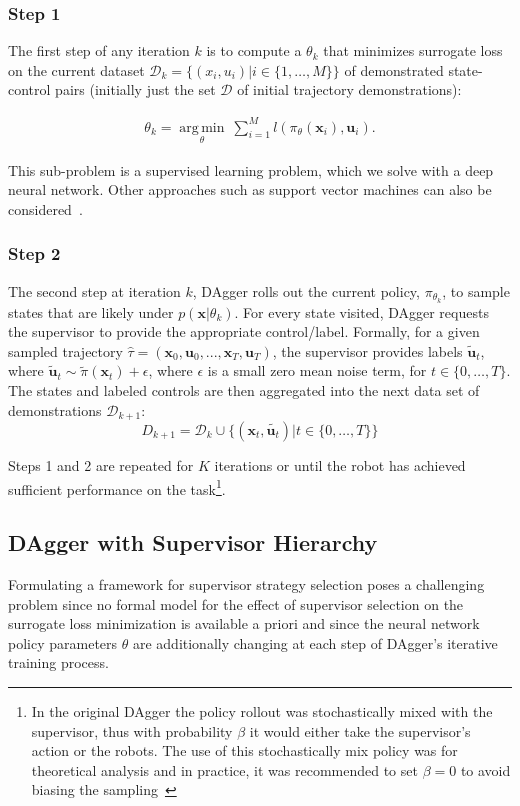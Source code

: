 \documentclass[10pt, conference]{ieeeconf}      %
\DeclareMathOperator*{\argmin}{arg\,min}
\newcommand{\bu}{\mathbf{u}}
\newcommand{\bx}{\mathbf{x}}
\begin{document}
\subsubsection{Step 1}
The first step of any iteration $k$ is to compute a $\theta_k$ that minimizes surrogate loss on the current dataset $\mathcal{D}_k=\{(x_i,u_i)|i\in\{1,\ldots,M\}\}$ of demonstrated state-control pairs (initially just the set $\mathcal{D}$ of initial trajectory demonstrations):

 \vspace{-1ex}
\begin{align}\label{eq:super_objj}
\theta_{k} = \underset{\theta}{\argmin} \: \sum_{i=1}^{M} l(\pi_{\theta}(\bx_i),\bu_i).
\end{align}

This sub-problem is a supervised learning problem, which we solve with a deep neural network. Other approaches such as
support vector machines can also be considered~\cite{scholkopf2002learning}. 
 

 \subsubsection{Step 2}
The second step at iteration $k$, DAgger rolls out the current policy, $\pi_{\theta_{k}}$, to sample states that are likely under $p(\bx|\theta_{k})$.  For every state visited, DAgger requests the supervisor to provide the appropriate control/label. Formally, for a given sampled trajectory  $\hat{\tau} = (\bx_0,\bu_0,...,\bx_T,\bu_T )$, the supervisor provides labels $\tilde{\bu}_t$, where $\tilde{\bu}_t \sim \tilde{\pi}(\bx_t) + \epsilon$, where $\epsilon$ is a small zero mean noise term, for $t\in \{0, \ldots, T\}$.
The states and labeled controls are then aggregated into the next data set of demonstrations $\mathcal{D}_{k+1}$:
$$D_{k+1}=\mathcal{D}_k \cup \{(\bx_t,\tilde{\bu_t})|t\in\{0,\ldots,T\}\} $$

Steps 1 and 2 are repeated for $K$ iterations or until the robot has achieved sufficient performance on the
task\footnote{In the original DAgger the policy rollout was stochastically mixed with the supervisor, thus with
    probability $\beta$ it would either take the supervisor's action or the robots. The use of this stochastically mix
    policy was for theoretical analysis and in practice, it was recommended to set $\beta = 0$ to avoid biasing the
sampling~\cite{NIPS2014_5421,ross2010reduction}}.


\subsection{DAgger with Supervisor Hierarchy}
Formulating a framework for supervisor strategy selection poses a challenging problem since no formal model
for the effect of supervisor selection on the surrogate loss minimization is available a priori and since the
neural network policy parameters $\theta$ are additionally changing at each step of DAgger's iterative training process.
\end{document}
